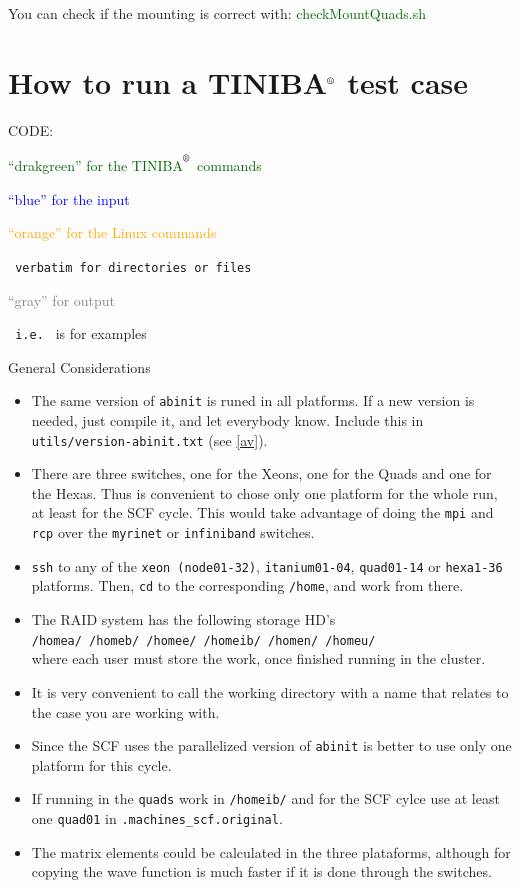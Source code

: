 \documentclass[12pt,leqno]{article}
\def\reg{\textsuperscript{\textregistered}}
\numberwithin{equation}{section}
\begin{document}
You can check if the mounting is correct with:
\textcolor{darkgreen}{checkMountQuads.sh} 

\section{How to run a TINIBA$^{\reg}$ test case}

CODE:

\textcolor{darkgreen}{``drakgreen'' for the TINIBA$^{\reg}$ commands}

\textcolor{blue}{``blue'' for the input}

\textcolor{orange}{``orange'' for the Linux commands}

\verb= verbatim for directories or files=

\textcolor{gray}{``gray'' for output}

\verb= i.e. = is for examples\\

\centerline{General Considerations}
\begin{itemize}
\item The same version of \verb=abinit= is runed in all platforms. If
  a new version is needed, just compile it, and let everybody
  know. Include this in \verb=utils/version-abinit.txt= (see \ref{av}).

\item There are three switches, one for the Xeons, one for the Quads
  and one for the Hexas. Thus is convenient to chose only one platform
  for the whole run, at least for the SCF cycle. This would take
  advantage of doing the \verb=mpi= and \verb=rcp= over the
  \verb=myrinet= or \verb=infiniband= switches.
\item \verb=ssh= to any of the \verb=xeon (node01-32)=, \verb=itanium01-04=,
  \verb=quad01-14= or \verb=hexa1-36= platforms. Then, \verb=cd= to the
  corresponding \verb=/home=, and work from there.
\item The RAID system has the following storage HD's\\
 \verb=/homea/ /homeb/ /homee/ /homeib/ /homen/ /homeu/=\\
where each user must store the work, once finished running in the cluster. 
\item It is very convenient to call the working directory with a
name that relates to the case you are working with. 
\item Since the SCF uses the parallelized version of \verb=abinit= is
  better to use only one platform for this cycle.
\item If running in the \verb=quads= work in \verb=/homeib/=
and for the SCF cylce use at least
one \verb=quad01= in \verb=.machines_scf.original=.
\item The matrix elements could be calculated in the three plataforms,
  although for copying the wave function is much faster if it is done
  through the switches.  

\end{itemize}
\end{document}
